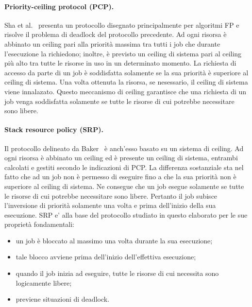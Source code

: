 \paragraph{Priority-ceiling protocol (PCP).} Sha et al.~\cite{Sha:1990:PIP:102822.626613} presenta un protocollo disegnato principalmente per algoritmi FP e risolve il problema di deadlock del protocollo precedente. Ad ogni risorsa è abbinato un ceiling pari alla priorità massima tra tutti i job che durante l'esecuzione la richiedono; inoltre, è previsto un ceiling di sistema pari al ceiling più alto tra tutte le risorse in uso in un determinato momento. La richiesta di accesso da parte di un job è soddisfatta solamente se la sua priorità è superiore al ceiling di sistema. Una volta ottenuta la risorsa, se nesessario, il ceiling di sistema viene innalazato. Questo meccanismo di ceiling garantisce che una richiesta di un job venga soddisfatta solamente se tutte le risorse di cui potrebbe necessitare sono libere.\\

\paragraph{Stack resource policy (SRP).} Il protocollo delineato da Baker~\cite{Baker:1991:SSR:113595.113601} è anch'esso basato su un sistema di ceiling. Ad ogni risorsa è abbinato un ceiling ed è presente un ceiling di sistema, entrambi calcolati e gestiti secondo le indicazioni di PCP. La differenza sostanziale sta nel fatto che ad un job non è permesso di eseguire fino a che la sua priorità non è superiore al ceiling di sistema. Ne consegue che un job esegue solamente se tutte le risorse di cui potrebbe necessitare sono libere. Pertanto il job subisce l'inversione di priorità solamente una volta e prima dell'inizio della sua esecuzione. SRP e' alla base del protocollo studiato in questo elaborato per le sue proprietà fondamentali:

\begin{itemize}
\item un job è bloccato al massimo una volta durante la sua esecuzione;
\item tale blocco avviene prima dell’inizio dell’effettiva esecuzione;
\item quando il job inizia ad eseguire, tutte le risorse di cui necessita sono logicamente libere;
\item previene situazioni di deadlock.
\end{itemize}


